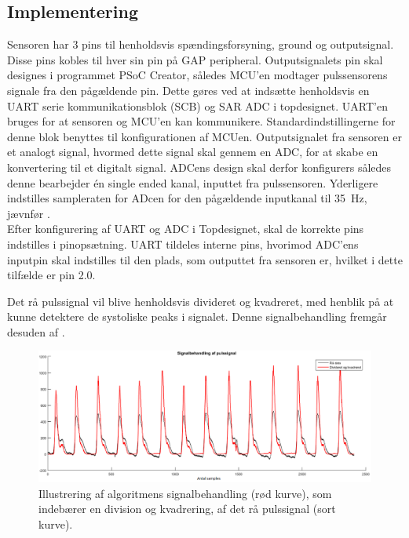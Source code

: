 \subsection{Implementering}
Sensoren har 3 pins til henholdsvis spændingsforsyning, ground og outputsignal. Disse pins kobles til hver sin pin på GAP peripheral. Outputsignalets pin skal designes i programmet PSoC Creator, således MCU'en modtager pulssensorens signale fra den pågældende pin. Dette gøres ved at indsætte henholdsvis en UART serie kommunikationsblok (SCB) og SAR ADC i topdesignet. UART'en bruges for at sensoren og MCU'en kan kommunikere. Standardindstillingerne for denne blok benyttes til konfigurationen af MCUen. \newline
Outputsignalet fra sensoren er et analogt signal, hvormed dette signal skal gennem en ADC, for at skabe en konvertering til et digitalt signal. ADCens design skal derfor konfigurers således denne bearbejder én single ended kanal, inputtet fra pulssensoren. Yderligere indstilles sampleraten for ADcen for den pågældende inputkanal til 35~Hz, jævnfør . \\
Efter konfigurering af UART og ADC i Topdesignet, skal de korrekte pins indstilles i pinopsætning. UART tildeles interne pins, hvorimod ADC'ens inputpin skal indstilles til den plads, som outputtet fra sensoren er, hvilket i dette tilfælde er pin 2.0. 

Det rå pulssignal vil blive henholdsvis divideret og kvadreret, med henblik på at kunne detektere de systoliske peaks i signalet. Denne signalbehandling fremgår desuden af .

\begin{figure}[H]
	\centering
	\includegraphics[scale=0.46]{figures/cDesign/puls_ore_behandlet.png}
	\caption{Illustrering af algoritmens signalbehandling (rød kurve), som indebærer en division og kvadrering, af det rå pulssignal (sort kurve).}
	\label{fig:behandlet_puls}
\end{figure}

